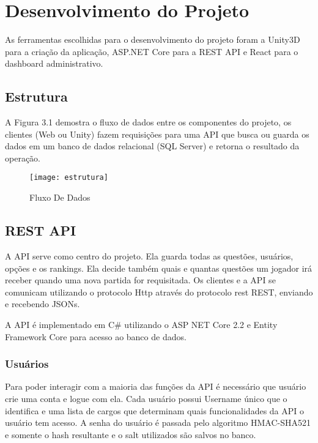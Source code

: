 \chapter{Desenvolvimento do Projeto}
\label{chap:desenv}

As ferramentas escolhidas para o desenvolvimento do projeto foram a Unity3D para a criação da aplicação, ASP.NET Core para a REST API e React para o dashboard administrativo.
 
\section{Estrutura}
\label{sec:estrutura}

A Figura 3.1 demostra o fluxo de dados entre os componentes do projeto, os clientes (Web ou Unity) fazem requisições  para uma API que busca ou guarda os dados em um banco de dados relacional (SQL Server) e retorna o resultado da operação.

\begin{figure}[htb]
\caption{\label{fig:estrutura} Fluxo De Dados }
\begin{center}
\texttt{[image: estrutura]}
\end{center}
\end{figure}


\section{REST API}
\label{sec:restapi}


A API serve como centro do projeto. Ela guarda todas as questões, usuários, opções e os rankings. Ela decide também quais e quantas questões um jogador irá receber quando uma nova partida for requisitada. 
Os clientes e a API se comunicam utilizando o protocolo Http\cite{rcfHttp} através do protocolo rest  REST\cite{wwrest}, enviando e recebendo JSONs.

A API é implementado em C\# utilizando o ASP NET Core 2.2 e Entity Framework Core para acesso ao banco de dados.

\subsection{Usuários}
\label{subsec:usuários}

Para poder interagir com a maioria das funções da API é necessário que usuário crie uma conta e logue com ela.
Cada usuário possui Username único que o identifica e uma lista de cargos que determinam quais funcionalidades da API o usuário tem acesso. 
A senha do usuário é passada pelo algoritmo HMAC-SHA521\cite{rcfHAMAC} e somente o hash resultante e o salt utilizados são salvos no banco.

